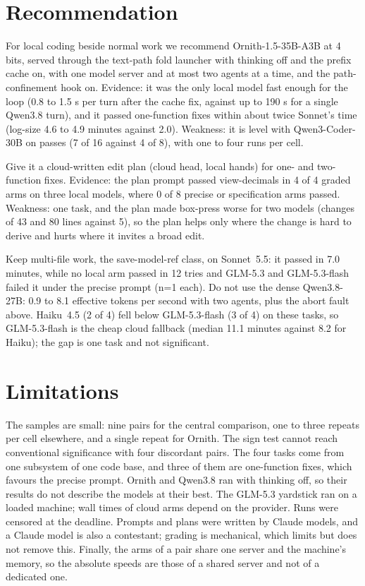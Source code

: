\section{Recommendation}\label{sec:recommendation}

For local coding beside normal work we recommend Ornith-1.5-35B-A3B at 4 bits, served through the text-path fold launcher
with thinking off and the prefix cache on, with one model server and at most two agents at a time, and the
path-confinement hook on. Evidence: it was the only local model fast enough for the loop (0.8 to 1.5 s per turn after the
cache fix, against up to 190 s for a single Qwen3.8 turn), and it passed one-function fixes within about twice Sonnet's
time (log-size 4.6 to 4.9 minutes against 2.0). Weakness: it is level with Qwen3-Coder-30B on passes (7 of 16 against
4 of 8), with one to four runs per cell.

Give it a cloud-written edit plan (cloud head, local hands) for one- and two-function fixes. Evidence: the plan prompt
passed view-decimals in 4 of 4 graded arms on three local models, where 0 of 8 precise or specification arms passed.
Weakness: one task, and the plan made box-press worse for two models (changes of 43 and 80 lines against 5), so the plan
helps only where the change is hard to derive and hurts where it invites a broad edit.

Keep multi-file work, the save-model-ref class, on Sonnet~5.5: it passed in 7.0 minutes, while no local arm passed in
12 tries and GLM-5.3 and GLM-5.3-flash failed it under the precise prompt (n=1 each). Do not use the dense Qwen3.8-27B:
0.9 to 8.1 effective tokens per second with two agents, plus the abort fault above. Haiku~4.5 (2 of 4) fell below
GLM-5.3-flash (3 of 4) on these tasks, so GLM-5.3-flash is the cheap cloud fallback (median 11.1 minutes against 8.2 for
Haiku); the gap is one task and not significant.

\section{Limitations}\label{sec:limits}

The samples are small: nine pairs for the central comparison, one to three repeats per cell elsewhere, and a single
repeat for Ornith. The sign test cannot reach conventional significance with four discordant pairs. The four tasks come
from one subsystem of one code base, and three of them are one-function fixes, which favours the precise prompt. Ornith
and Qwen3.8 ran with thinking off, so their results do not describe the models at their best. The GLM-5.3 yardstick
ran on a loaded machine; wall times of cloud arms depend on the provider. Runs were censored at the deadline. Prompts
and plans were written by Claude models, and a Claude model is also a contestant; grading is mechanical, which limits
but does not remove this. Finally, the arms of a pair share one server and the machine's memory, so the absolute
speeds are those of a shared server and not of a dedicated one.

\clearpage
{}
{}
\printbibliography[title={References}]


